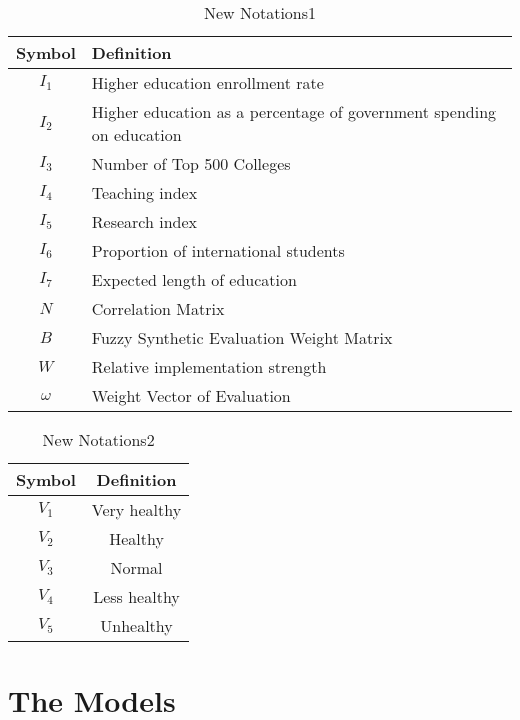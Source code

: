 \documentclass[12pt]{article}  %
\begin{document}
\begin{table}[htbp]
\begin{center}
	\caption{New Notations1}
	\begin{tabular}{cl} %
		\toprule
	\multicolumn{1}{m{3cm}}{\centering Symbol}
	&\multicolumn{1}{m{12cm}}{\centering Definition}\\
		\midrule
		$I_1$&Higher education enrollment rate\\
		$I_2$&   Higher education as a percentage of government spending on education\\
		$I_3$&   Number of Top 500 Colleges\\
		$I_4$&   Teaching index\\
		$I_5$&   Research index\\
		$I_6$&   Proportion of international students\\
		$I_7$&   Expected length of education\\
		$N$&   Correlation Matrix\\
		$B$&   Fuzzy Synthetic Evaluation Weight Matrix\\
		$W$&   Relative implementation strength\\
		$\omega$&   Weight Vector of Evaluation\\
		\bottomrule
	\end{tabular}\label{tb:nnn}
\end{center}
\end{table}
\newpage
\begin{table}[htp]
	\begin{center}
		\caption{New Notations2}
		\begin{tabular}{cc} %
			\toprule
			\multicolumn{1}{m{3cm}}{\centering Symbol}
			&\multicolumn{1}{m{6cm}}{\centering Definition}\\
			\midrule
		$V_1$&   Very healthy\\
		$V_2$&   Healthy\\
		$V_3$&   Normal\\
		$V_4$&   Less healthy\\
		$V_5$&   Unhealthy\\
			\bottomrule
		\end{tabular}\label{tb:ooo}
	\end{center}
\end{table}

\section{The Models}
\end{document}
